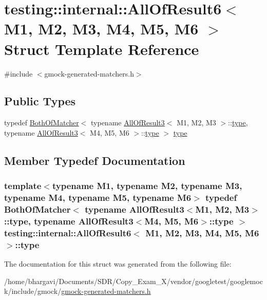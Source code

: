 \hypertarget{structtesting_1_1internal_1_1_all_of_result6}{}\section{testing\+:\+:internal\+:\+:All\+Of\+Result6$<$ M1, M2, M3, M4, M5, M6 $>$ Struct Template Reference}
\label{structtesting_1_1internal_1_1_all_of_result6}


{\ttfamily \#include $<$gmock-\/generated-\/matchers.\+h$>$}

\subsection*{Public Types}
\begin{DoxyCompactItemize}
\item 
typedef \hyperlink{classtesting_1_1internal_1_1_both_of_matcher}{Both\+Of\+Matcher}$<$ typename \hyperlink{structtesting_1_1internal_1_1_all_of_result3}{All\+Of\+Result3}$<$ M1, M2, M3 $>$\+::\hyperlink{structtesting_1_1internal_1_1_all_of_result6_a5385655911ce2c1d3fccd802c1754139}{type}, typename \hyperlink{structtesting_1_1internal_1_1_all_of_result3}{All\+Of\+Result3}$<$ M4, M5, M6 $>$\+::\hyperlink{structtesting_1_1internal_1_1_all_of_result6_a5385655911ce2c1d3fccd802c1754139}{type} $>$ \hyperlink{structtesting_1_1internal_1_1_all_of_result6_a5385655911ce2c1d3fccd802c1754139}{type}
\end{DoxyCompactItemize}


\subsection{Member Typedef Documentation}
\subsubsection[{\texorpdfstring{type}{type}}]{\setlength{\rightskip}{0pt plus 5cm}template$<$typename M1, typename M2, typename M3, typename M4, typename M5, typename M6$>$ typedef {\bf Both\+Of\+Matcher}$<$ typename {\bf All\+Of\+Result3}$<$M1, M2, M3$>$\+::{\bf type}, typename {\bf All\+Of\+Result3}$<$M4, M5, M6$>$\+::{\bf type} $>$ {\bf testing\+::internal\+::\+All\+Of\+Result6}$<$ M1, M2, M3, M4, M5, M6 $>$\+::{\bf type}}\hypertarget{structtesting_1_1internal_1_1_all_of_result6_a5385655911ce2c1d3fccd802c1754139}{}\label{structtesting_1_1internal_1_1_all_of_result6_a5385655911ce2c1d3fccd802c1754139}


The documentation for this struct was generated from the following file\+:\begin{DoxyCompactItemize}
\item 
/home/bhargavi/\+Documents/\+S\+D\+R/\+Copy\+\_\+\+Exam\+\_\+X/vendor/googletest/googlemock/include/gmock/\hyperlink{gmock-generated-matchers_8h}{gmock-\/generated-\/matchers.\+h}\end{DoxyCompactItemize}

